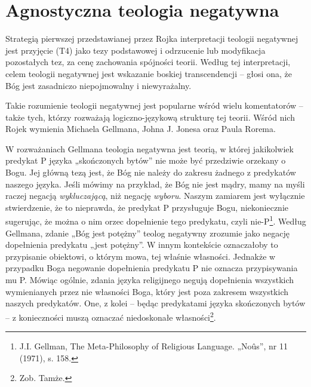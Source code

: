 \section{Agnostyczna teologia negatywna}

Strategią pierwszej przedstawianej przez Rojka interpretacji teologii
negatywnej jest przyjęcie (T4) jako tezy podstawowej i odrzucenie lub
modyfikacja pozostałych tez, za cenę zachowania spójności teorii.
Według tej interpretacji, celem teologii negatywnej jest wskazanie
boskiej transcendencji -- głosi ona, że Bóg jest zasadniczo
niepojmowalny i niewyrażalny.

Takie rozumienie teologii negatywnej jest popularne wśród wielu
komentatorów -- także tych, którzy rozważają logiczno-językową strukturę
tej teorii. Wśród nich Rojek wymienia Michaela Gellmana, Johna J.
Jonesa oraz Paula Rorema.

W rozważaniach Gellmana teologia negatywna jest teorią, w której
jakikolwiek predykat P języka „skończonych bytów” nie może być
przedziwie orzekany o Bogu. Jej główną tezą jest, że Bóg nie należy do
zakresu żadnego z predykatów naszego języka. Jeśli mówimy na przykład,
że Bóg nie jest mądry, mamy na myśli raczej negacją
\textit{wykluczającą}, niż negację \textit{wyboru}. Naszym zamiarem
jest wyłącznie stwierdzenie, że to nieprawda, że predykat P przysługuje
Bogu, niekoniecznie sugerując, że można o nim orzec dopełnienie tego
predykatu, czyli nie-P\footnote{J.I. Gellman, The Meta-Philosophy of
Religious Language. „No\^us”, nr 11 (1971), s. 158. }. Według
Gellmana, zdanie „Bóg jest potężny” teolog negatywny zrozumie jako
negację dopełnienia predykatu „jest potężny”. W innym kontekście
oznaczałoby to przypisanie obiektowi, o którym mowa, tej właśnie
własności. Jednakże w przypadku Boga negowanie dopełnienia predykatu P
nie oznacza przypisywania mu P. Mówiąc ogólnie, zdania języka
religijnego negują dopełnienia wszystkich wymienianych przez nie
własności Boga, który jest poza zakresem wszystkich naszych predykatów.
One, z kolei -- będąc predykatami języka skończonych bytów -- z
konieczności muszą oznaczać niedoskonałe własności\footnote{Zob.
Tamże. }.

